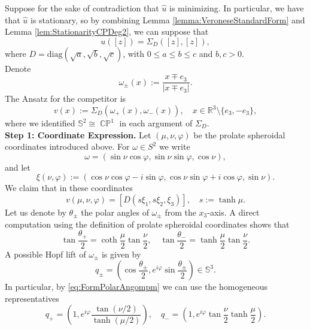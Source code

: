 \documentclass[11pt]{article}
\theoremstyle{plain}
\numberwithin{equation}{section}
\theoremstyle{definition}
\let\oldendproof\endproof
\renewenvironment{proof}[1][\proofname]{%
\oldproof[\upshape \bfseries #1]%
}{\oldendproof}
\def \R {\mathbb{R}}
\def \mb{\mathbb}
\DeclareMathOperator{\CP}{\mathbb{CP}}
\begin{document}
\begin{proof}[Proof of Proposition \ref{prop:step3}]
    Suppose for the sake of contradiction that $\hat u$ is minimizing. In particular, we have that $\hat u$ is stationary, so by combining Lemma \ref{lemma:VeroneseStandardForm} and Lemma \ref{lem:StationarityCPDeg2}, we can suppose that
    \[
    u([z])=\Sigma_D([z],[z]),
    \]
    where $D=\mathrm{diag}(\sqrt{a},\sqrt{b},\sqrt{c})$, with $0\leq a \leq b\leq c$ and $b,c>0$. \\
    Denote
    \[
        \omega_{\pm}(x):=\frac{x\mp e_3}{|x\mp e_3|}.
    \]
    The Ansatz for the competitor is 
    \begin{equation}
        \label{eq:AnsatzComp}
        v(x):=\Sigma_D(\omega_+(x),\omega_-(x)),\quad x\in \R^3\setminus \{e_3,-e_3\},
    \end{equation}
    where we identified $\mb S^2 \cong \CP^1$ in each argument of $\Sigma_D$.\\
    \textbf{Step 1: Coordinate Expression.} Let $(\mu,\nu,\varphi)$ be the prolate spheroidal coordinates introduced above. For $\omega \in S^2$ we write
    \[
    \omega=(\sin \nu \cos \varphi,\sin \nu \sin \varphi,\cos \nu),
    \]
    and let
    \begin{equation}
        \label{def:XiProj}
        \xi(\nu,\varphi):=(\cos \nu \cos\varphi-i\sin\varphi,\cos\nu\sin\varphi+i\cos\varphi,\sin\nu).
    \end{equation}
    We claim that in these coordinates
    \begin{equation}
        \label{eq:CoordinateVeps}
        v(\mu,\nu,\varphi)=\left[ D(s\xi_1,s\xi_2,\xi_3)\right],\quad s:=\tanh \mu.
    \end{equation}
    Let us denote by $\theta_{\pm}$ the polar angles of $\omega_\pm$ from the $x_3$-axis. A direct computation using the definition of prolate spheroidal coordinates shows that
    \begin{equation}
        \label{eq:FormPolarAngompm}
        \tan\frac{\theta_+}{2}=\coth \frac{\mu}{2}\tan \frac{\nu}{2},\quad \tan\frac{\theta_-}{2}=\tanh \frac{\mu}{2}\tan \frac{\nu}{2}.
    \end{equation}
    A possible Hopf lift of $\omega_\pm$ is given by
    \[
    q_{\pm}=\left(\cos\frac{\theta_\pm}{2},e^{i\varphi}\sin\frac{\theta_\pm}{2}\right) \in \mb S^3.
    \]
    In particular, by \eqref{eq:FormPolarAngompm} we can use the homogeneous representatives
    \[
    q_+=\left(1,e^{i\varphi}\frac{\tan(\nu/2)}{\tanh(\mu/2)}\right),\quad q_-=\left(1,e^{i\varphi}\tan\frac\nu 2\tanh\frac{\mu}{2}\right).
\]
\end{proof}
\end{document}
